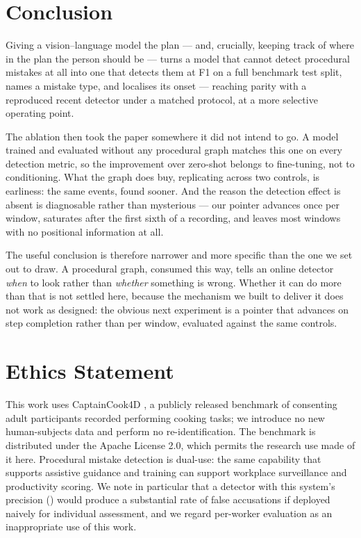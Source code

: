 \documentclass[10pt,twocolumn]{article}
\begin{document}
\section{Conclusion}

Giving a vision--language model the plan --- and, crucially, keeping track of
where in the plan the person should be --- turns a model that cannot detect
procedural mistakes at all into one that detects them at \resF{} F1 on a full
benchmark test split, names a mistake type, and localises its onset --- reaching
parity with a reproduced recent detector under a matched protocol, at a more
selective operating point.

The ablation then took the paper somewhere it did not intend to go. A model
trained and evaluated without any procedural graph matches this one on every
detection metric, so the improvement over zero-shot belongs to fine-tuning, not
to conditioning. What the graph does buy, replicating across two controls, is
earliness: the same events, found sooner. And the reason the detection effect is
absent is diagnosable rather than mysterious --- our pointer advances once per
window, saturates after the first sixth of a recording, and leaves most windows
with no positional information at all.

The useful conclusion is therefore narrower and more specific than the one we
set out to draw. A procedural graph, consumed this way, tells an online detector
\emph{when} to look rather than \emph{whether} something is wrong. Whether it
can do more than that is not settled here, because the mechanism we built to
deliver it does not work as designed: the obvious next experiment is a pointer
that advances on step completion rather than per window, evaluated against the
same controls.

\section*{Ethics Statement}
This work uses CaptainCook4D \citep{peddi2024captaincook4d}, a publicly released
benchmark of consenting adult participants recorded performing cooking tasks; we
introduce no new human-subjects data and perform no re-identification. The
benchmark is distributed under the Apache License 2.0, which permits the research
use made of it here. Procedural
mistake detection is dual-use: the same capability that supports assistive
guidance and training can support workplace surveillance and productivity
scoring. We note in particular that a detector with this system's precision
(\resP{}) would produce a substantial rate of false accusations if deployed
naively for individual assessment, and we regard per-worker evaluation as an
inappropriate use of this work.
\end{document}
